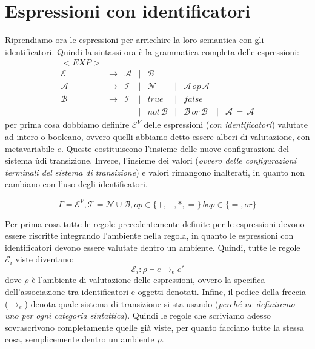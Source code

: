 \documentclass[oneside,a4paper,11pt]{book}
\theoremstyle{italicstyle}
\theoremstyle{normStyle}
\begin{document}
\section{Espressioni con identificatori}
Riprendiamo ora le espressioni per arricchire la loro semantica con gli 
identificatori. Quindi la sintassi ora è la grammatica completa delle espressioni:
\[
\begin{matrix}
<EXP> \\
       \mathcal{E} & \longrightarrow & \mathcal{A} & | & \mathcal{B}\\
       \mathcal{A} & \longrightarrow & \mathcal{I} & | & \mathcal{N} & | & \mathcal{A}\,op\,\mathcal{A}\\
       \mathcal{B} & \longrightarrow & \mathcal{I} & | & true & | & false \\
       & & &| & not \, \mathcal{B} & | &
      \mathcal{B} \,or\,\mathcal{B} & | & \mathcal{A} \,=\,\mathcal{A}
\end{matrix}
\]
per prima cosa dobbiamo definire $\mathcal{E}^V$ delle espressioni (\textit{con identificatori}) valutate 
ad intero o booleano, ovvero quelli abbiamo detto essere alberi di valutazione, con 
metavariabile $e$. Queste costituiscono l'insieme delle nuove configurazioni del sistema ùdi transizione. Invece, 
l'insieme dei valori (\textit{ovvero delle configurazioni terminali del 
sistema di transizione}) e valori rimangono inalterati, in quanto non cambiano con 
l'uso degli identificatori.
\begin{tcolorbox}[title = {Sistema di transizione}]
  \[
    \Gamma = \mathcal{E}^V, \mathcal{T}= \mathcal{N}\cup\mathcal{B}, op\in\{+,-,*,=\}\,bop\in \{=,or\}
  \]
\end{tcolorbox} 
Per prima cosa tutte le regole precedentemente definite per le espressioni
devono essere riscritte integrando l’ambiente nella regola, in quanto
le espressioni con identificatori devono essere valutate dentro un
ambiente. Quindi, tutte le regole $\mathcal{E}_i$ viste diventano:
\[
  \mathcal{E}_i: \rho \vdash e \rightarrow_e e'
\]
dove $\rho$ è l’ambiente di valutazione delle espressioni,
ovvero la specifica dell’associazione tra identificatori e oggetti
denotati. Infine, il pedice della freccia ($\rightarrow_e$) denota quale
sistema di transizione si sta usando (\textit{perché ne definiremo uno per
ogni categoria sintattica}).
Quindi le regole che scriviamo adesso sovrascrivono completamente
quelle già viste, per quanto facciano tutte la stessa cosa,
semplicemente dentro un ambiente $\rho$.
\end{document}
